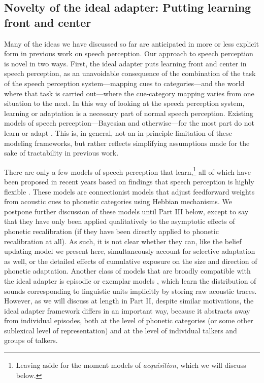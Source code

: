 \subsection{Novelty of the ideal adapter: Putting learning front and center}
\label{sec:novelty-ideal-adapt}
\label{r2-part1-novelty}

Many of the ideas we have discussed so far are anticipated in more or less explicit form in previous work on speech perception.  Our approach to speech perception is novel in two ways.  First, the ideal adapter puts learning front and center in speech perception, as an unavoidable consequence of the combination of the task of the speech perception system---mapping cues to categories---and the world where that task is carried out---where the cue-category mapping varies from one situation to the next.  In this way of looking at the speech perception system, learning or adaptation is a necessary part of normal speech perception.  Existing models of speech perception---Bayesian and otherwise---for the most part do not learn or adapt \autocite{Clayards2008,Feldman2009a,McClelland1986,Norris1994,Norris2000}.  This is, in general, not an in-principle limitation of these modeling frameworks, but rather reflects simplifying assumptions made for the sake of tractability in previous work.  

There are only a few models of speech perception that learn,\footnote{Leaving aside for the moment models of \emph{acquisition}, which we will discuss below.} all of which have been proposed in recent years based on findings that speech perception is highly flexible \autocite{Lancia2013,Mirman2006}.  These models are connectionist models that adjust feedforward weights from acoustic cues to phonetic categories using Hebbian mechanisms.  
We postpone further discussion of these models until Part III below, except to say that they have only been applied qualitatively to the asymptotic effects of phonetic recalibration (if they have been directly applied to phonetic recalibration at all).  As such, it is not clear whether they can, like the belief updating model we present here, simultaneously account for selective adaptation as well, or the detailed effects of cumulative exposure on the size and direction of phonetic adaptation.  Another class of models that are broadly compatible with the ideal adapter is episodic or exemplar models \autocite[e.g.,][]{Johnson1997a,Goldinger1998,Pierrehumbert2003}, which learn the distribution of sounds corresponding to linguistic units implicitly by storing raw acoustic traces.  However, as we will discuss at length in Part II, despite similar motivations, the ideal adapter framework differs in an important way, because it abstracts away from individual episodes, both at the level of phonetic categories (or some other sublexical level of representation) and at the level of individual talkers and groups of talkers.


